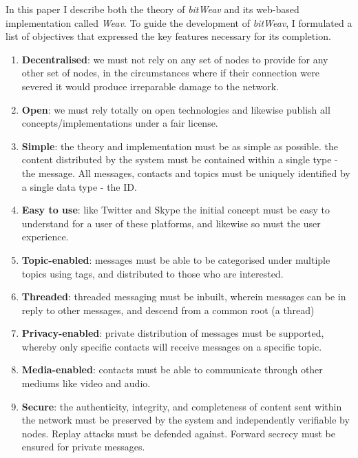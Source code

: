\documentclass[10pt,a4paper,onecolumn]{article}
\begin{document}
In this paper I describe both the theory of \textit{bitWeav} and its web-based implementation called \textit{Weav}. To guide the development of \textit{bitWeav}, I formulated a list of objectives that expressed the key features necessary for its completion.
\begin{enumerate}
\item \textbf{Decentralised}: we must not rely on any set of nodes to provide for any other set of nodes, in the circumstances where if their connection were severed it would produce irreparable damage to the network. 

\item \textbf{Open}: we must rely totally on open technologies and likewise publish all concepts/implementations under a fair license.

\item \textbf{Simple}: the theory and implementation must be as simple as possible. the content distributed by the system must be contained within a single type - the message. All messages, contacts and topics must be uniquely identified by a single data type - the ID.

\item \textbf{Easy to use}: like Twitter and Skype the initial concept must be easy to understand for a user of these platforms, and likewise so must the user experience.

\item \textbf{Topic-enabled}: messages must be able to be categorised under multiple topics using tags, and distributed to those who are interested.

\item \textbf{Threaded}: threaded messaging must be inbuilt, wherein messages can be in reply to other messages, and descend from a common root (a thread)

\item \textbf{Privacy-enabled}: private distribution of messages must be supported, whereby only specific contacts will receive messages on a specific topic.

\item \textbf{Media-enabled}: contacts must be able to communicate through other mediums like video and audio. 

\item \textbf{Secure}: the authenticity, integrity, and completeness of content sent within the network must be preserved by the system and independently verifiable by nodes. Replay attacks must be defended against. Forward secrecy must be ensured for private messages.
\end{enumerate}
\end{document}
